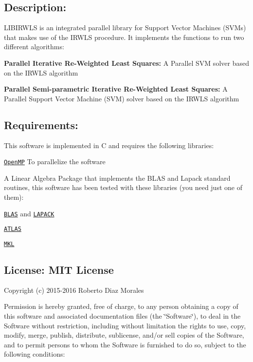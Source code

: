 \subsection*{Description\+: }

L\+I\+B\+I\+R\+W\+LS is an integrated parallel library for Support Vector Machines (S\+V\+Ms) that makes use of the I\+R\+W\+LS procedure. It implements the functions to run two different algorithms\+:

{\bfseries Parallel Iterative Re-\/\+Weighted Least Squares\+:} A Parallel S\+VM solver based on the I\+R\+W\+LS algorithm

{\bfseries Parallel Semi-\/parametric Iterative Re-\/\+Weighted Least Squares\+:} A Parallel Support Vector Machine (S\+VM) solver based on the I\+R\+W\+LS algorithm

\subsection*{Requirements\+: }

This software is implemented in C and requires the following libraries\+:


\begin{DoxyItemize}
\item \href{http://openmp.org/wp/}{\tt Open\+MP} To parallelize the software
\item A Linear Algebra Package that implements the B\+L\+AS and Lapack standard routines, this software has been tested with these libraries (you need just one of them)\+:
\begin{DoxyItemize}
\item \href{http://www.netlib.org/blas/}{\tt B\+L\+AS} and \href{http://www.netlib.org/lapack/}{\tt L\+A\+P\+A\+CK}
\item \href{http://math-atlas.sourceforge.net/}{\tt A\+T\+L\+AS}
\item \href{https://software.intel.com/en-us/intel-mkl}{\tt M\+KL}
\end{DoxyItemize}
\end{DoxyItemize}

\subsection*{License\+: M\+IT License }

Copyright (c) 2015-\/2016 Roberto Diaz Morales

Permission is hereby granted, free of charge, to any person obtaining a copy of this software and associated documentation files (the \char`\"{}\+Software\char`\"{}), to deal in the Software without restriction, including without limitation the rights to use, copy, modify, merge, publish, distribute, sublicense, and/or sell copies of the Software, and to permit persons to whom the Software is furnished to do so, subject to the following conditions\+:

